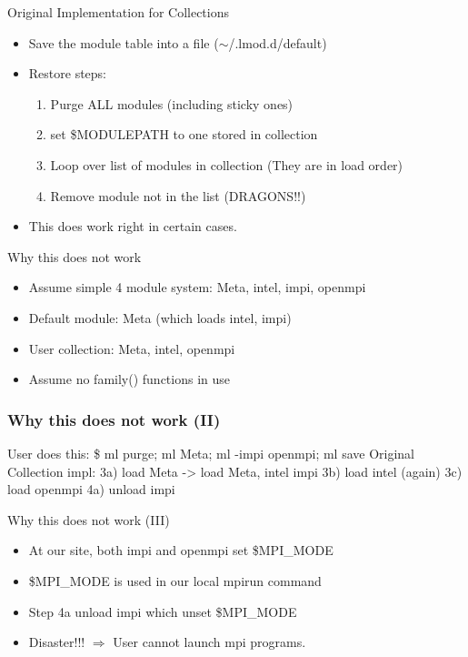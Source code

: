 \documentclass{beamer}
\begin{document}
\begin{frame}{Original Implementation for Collections}
  \begin{itemize}
    \item Save the module table into a file ($\sim$/.lmod.d/default)
    \item Restore steps:
      \begin{enumerate}
        \item Purge ALL modules (including sticky ones)
        \item set \$MODULEPATH to one stored in collection
        \item Loop over list of modules in collection (They are in
          load order)
        \item Remove module not in the list {\color{red} (DRAGONS!!)}
      \end{enumerate}
    \item This does work right in certain cases.
  \end{itemize}
\end{frame}

\begin{frame}{Why this does not work}
  \begin{itemize}
    \item Assume simple 4 module system: Meta, intel, impi, openmpi
    \item Default module: Meta (which loads intel, impi)
    \item User collection: Meta, intel, openmpi
    \item Assume no family() functions in use
  \end{itemize}
\end{frame}

\begin{frame}[fragile]
  \frametitle{Why this does not work (II)}
    {\small
\begin{semiverbatim}
User does this:
   \$ ml purge; ml Meta; ml -impi openmpi; ml save
Original Collection impl:
   3a) load Meta -> load Meta, intel impi
   3b) load intel (again)
   3c) load openmpi
   4a) unload impi
\end{semiverbatim}
    }
\end{frame}

\begin{frame}{Why this does not work (III)}
  \begin{itemize}
    \item At our site, both impi and openmpi set \$MPI\_MODE
    \item \$MPI\_MODE is used in our local mpirun command
    \item Step 4a unload impi which unset \$MPI\_MODE
    \item Disaster!!! $\Rightarrow$ User cannot launch mpi programs.
  \end{itemize}
\end{frame}
\end{document}
